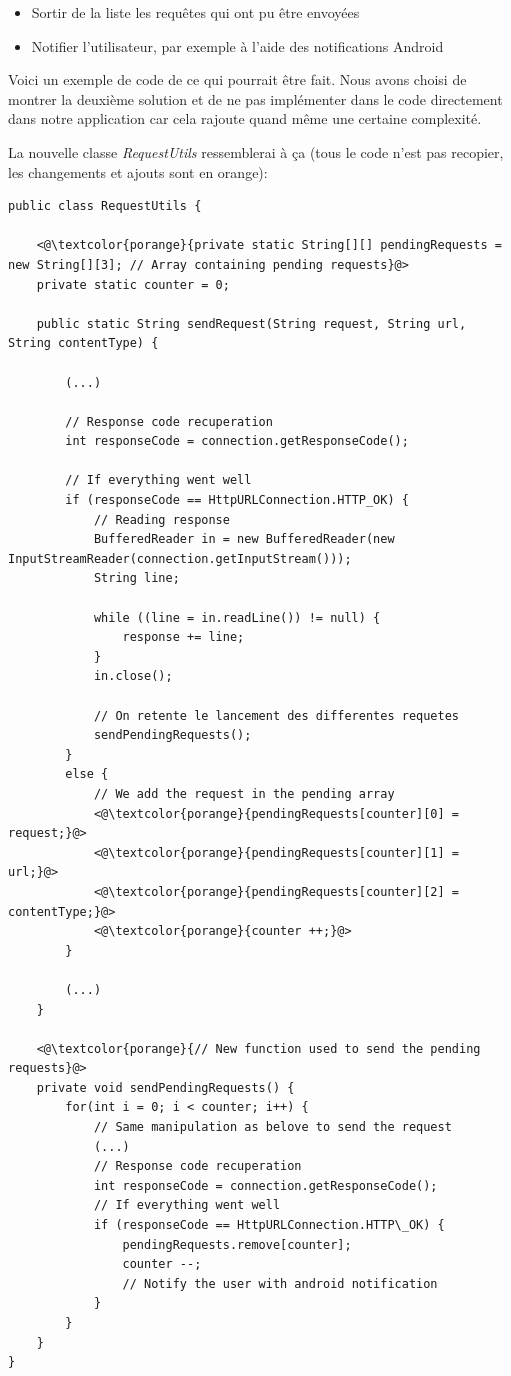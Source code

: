 \documentclass[12pt]{article}
\begin{document}
\begin{itemize}[resume]
\item Sortir de la liste les requêtes qui ont pu être envoyées
\item Notifier l'utilisateur, par exemple à l'aide des notifications Android
\end{itemize}

Voici un exemple de code de ce qui pourrait être fait. Nous avons choisi de montrer la deuxième solution et de ne pas implémenter dans le code directement dans notre application car cela rajoute quand même une certaine complexité.

La nouvelle classe \emph{RequestUtils} ressemblerai à ça (tous le code n'est pas recopier, les changements et ajouts sont en orange): \\

\begin{lstlisting}[style=java]
public class RequestUtils {

	<@\textcolor{porange}{private static String[][] pendingRequests = new String[][3]; // Array containing pending requests}@>
	private static counter = 0;
	
	public static String sendRequest(String request, String url, String contentType) {

		(...)      
            
		// Response code recuperation
		int responseCode = connection.getResponseCode();

		// If everything went well
		if (responseCode == HttpURLConnection.HTTP_OK) {		
			// Reading response
			BufferedReader in = new BufferedReader(new InputStreamReader(connection.getInputStream()));
			String line;

			while ((line = in.readLine()) != null) {
				response += line;
			}
			in.close();
                
			// On retente le lancement des differentes requetes
			sendPendingRequests();
		} 
		else {
			// We add the request in the pending array
			<@\textcolor{porange}{pendingRequests[counter][0] = request;}@>
			<@\textcolor{porange}{pendingRequests[counter][1] = url;}@>
			<@\textcolor{porange}{pendingRequests[counter][2] = contentType;}@>
			<@\textcolor{porange}{counter ++;}@>
		}

		(...)
	}
	
	<@\textcolor{porange}{// New function used to send the pending requests}@>
	private void sendPendingRequests() {
		for(int i = 0; i < counter; i++) {
			// Same manipulation as belove to send the request
			(...) 
			// Response code recuperation
			int responseCode = connection.getResponseCode();
			// If everything went well
			if (responseCode == HttpURLConnection.HTTP\_OK) {
				pendingRequests.remove[counter];
				counter --;
				// Notify the user with android notification
			}
		}
	}
}

\end{lstlisting}
\end{document}

